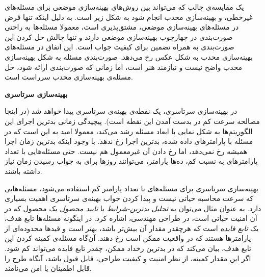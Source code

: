 
یک مقایسه‌ی جالب که می‌تواند بین روش‌های بهینه‌سازی موضعی برای مسئله‌های غیرخطی، و بهینه‌سازی محدب انجام شود به شکل زیر است. به دلیل اینکه تنها فرض در مسئله‌های بهینه‌سازی موضعی، مشتق‌پذیری است، معمولا مسئله‌ها به راحتی صورت‌بندی در چهارچوب بهینه‌سازی موضعی دارند و تنها چالش حل کردن این صورت‌بندی به همراه تضمین برای کیفیت جواب است. این اتفاق در مسئله‌های بهینه‌سازی محدب به شکل عکس رخ می‌دهد. صورت‌بندی مسئله به شکل بهینه‌سازی محدب واضح نیست و نیازمند هنر است، اما زمانی که صورت‌بندی ارائه شود، حل مسئله‌ی بهینه‌سازی محدب سرراست است.



\textbf{
بهینه‌سازی سرتاسری
}

در بهینه‌سازی سرتاسری، یک نقطه‌ی بهینه‌ی سرتاسری پیدا خواهد شد (در اینجا مصالحه سرعت کم در بدست آمدن این نقطه است). پیچیدگی زمانی بدترین اجرای این الگوریتم‌ها به شکل نمایی با ابعاد مسئله رشد می‌کند، معمولا امید به این است که در مسئله با پارامترهای داده شده، بدترین اجرا رخ ندهد. با وجود اینکه بدترین زمان اجرا همیشه رخ نمی‌دهد، اما رخ دادن آن غیرمعمول هم نیست. حتی مسئله‌هایی با تعداد پارامترهای به نسبت کم، ده‌ها پارامتر، می‌توانند روزها برای به جواب رسیدن زمان نیاز داشته باشند.


بهینه‌سازی سرتاسری برای مسئله‌های با تعداد پارامتر کم استفاده می‌شود، مسئله‌هایی که سرعت محاسبه حیاتی نیست و پیدا کردن جواب بهینه‌ی سرتاسری اهمیت بسیاری دارد. به عنوان مثال می‌توان به
\textit{
تحلیل بدترین-شرایط
} 
یا
\textit{
تایید محصول
} 
یک محصول که در آن امنیت حیاتی است، در طراحی مهندسی، اشاره کرد. در اینگونه مسئله‌ها تابع هدف، یک
\textit{
تابع فایده
} 
است که هرچقدر مقدار آن بیش‌تر باشد، بهتر است و قیدها محدوده‌ای از پارامترها هستند که در واقعیت ممکن است رخ دهند. آن‌گاه مسئله‌ی کمینه کردن این تابع هدف، بیان می‌کند که در بدترین رخداد ممکن، چقدر تابع فایده می‌تواند کم شود. اگر این مقدار کمینه، از نظر امنیت و کیفیت طراحی، قابل قبول باشد، آنگاه طرح را قابل اطمینان یا امن می‌نامند.


